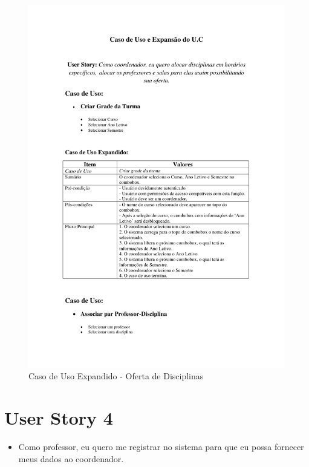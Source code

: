 \documentclass{abnt}
\begin{document}
		\begin{figure}[h]
			\begin{center}
				\includegraphics[bb=1.0in 1.0in 7.5in 10in,page=2]{ExpansaoU_C_OfertaDisciplinas.pdf}
				 \caption{Caso de Uso Expandido - Oferta de Disciplinas}
			\end{center}
		\end{figure}
		\FloatBarrier

			
	\clearpage
		\section{User Story 4}
	
			\begin{itemize}
				\item Como professor, eu quero me registrar no sistema para que eu possa fornecer meus dados ao coordenador.
			\end{itemize}
			
\end{document}
